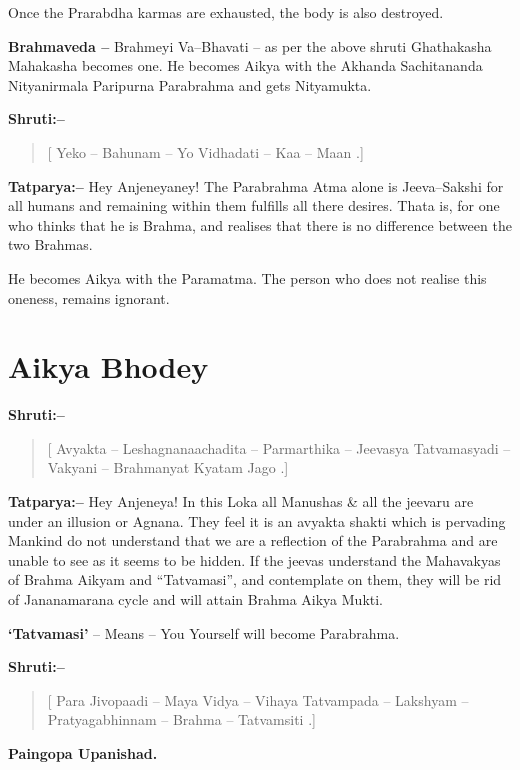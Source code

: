Once the Prarabdha karmas are exhausted, the body is also destroyed.

\textbf{Brahmaveda –} Brahmeyi Va–Bhavati – as per the above shruti Ghathakasha Mahakasha becomes one. He becomes Aikya with the Akhanda Sachitananda Nityanirmala Paripurna Parabrahma and gets Nityamukta.

\textbf{Shruti:–}

\begin{verse}
[ Yeko – Bahunam – Yo Vidhadati – Kaa – Maan .]
\end{verse}

\textbf{Tatparya:–} Hey Anjeneyaney! The Parabrahma Atma alone is Jeeva–Sakshi for all humans and remaining within them fulfills all there desires. Thata is, for one who thinks that he is Brahma, and realises that there is no difference between the two Brahmas.

He becomes Aikya with the Paramatma. The person who does not realise this oneness, remains ignorant.

\chapter{Aikya Bhodey}

\textbf{Shruti:–}

\begin{verse}
[ Avyakta – Leshagnanaachadita – Parmarthika – Jeevasya  Tatvamasyadi – Vakyani – Brahmanyat Kyatam Jago .]
\end{verse}

\textbf{Tatparya:–} Hey Anjeneya! In this Loka all Manushas \& all the jeevaru are under an illusion or Agnana. They feel it is an avyakta shakti which is pervading Mankind do not understand that we are a reflection of the Parabrahma and are unable to see as it seems to be hidden. If the jeevas understand the Mahavakyas of Brahma Aikyam and “Tatvamasi”, and contemplate on them, they will be rid of Jananamarana cycle and will attain Brahma Aikya Mukti.

\textbf{‘Tatvamasi’} – Means – You Yourself will become Parabrahma.

\textbf{Shruti:–}

\begin{verse}
[ Para Jivopaadi – Maya Vidya – Vihaya Tatvampada – Lakshyam – Pratyagabhinnam – Brahma – Tatvamsiti .]
\end{verse}

\begin{flushright}
\textbf{Paingopa Upanishad.}
\end{flushright}

